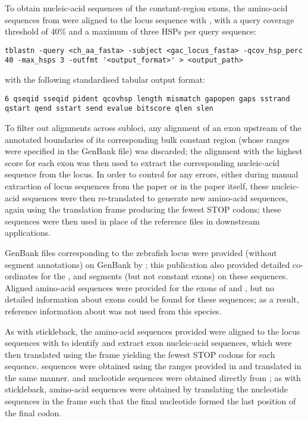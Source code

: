 To obtain nucleic-acid sequences of the constant-region exons, the amino-acid sequences from \parencite{bao2010stickleback} were aligned to the locus sequence with  \parencite{gertz2006tblastn}, with a query coverage threshold of 40\% and a maximum of three HSPs per query sequence:

\begin{lstlisting}
tblastn -query <ch_aa_fasta> -subject <gac_locus_fasta> -qcov_hsp_perc 40 -max_hsps 3 -outfmt '<output_format>' > <output_path>
\end{lstlisting}

\noindent with the following standardised tabular output format: 

\begin{lstlisting}
6 qseqid sseqid pident qcovhsp length mismatch gapopen gaps sstrand qstart qend sstart send evalue bitscore qlen slen
\end{lstlisting}

To filter out alignments across subloci, any alignment of an exon upstream of the annotated boundaries of its corresponding bulk constant region (whose ranges were specified in the GenBank file) was discarded; the alignment with the highest score for each exon was then used to extract the corresponding nucleic-acid sequence from the locus. In order to control for any errors, either during manual extraction of locus sequences from the paper or in the paper itself, these nucleic-acid sequences were then re-translated to generate new amino-acid sequences, again using the translation frame producing the fewest STOP codons; these sequences were then used in place of the reference files in downstream applications.


GenBank files corresponding to the zebrafish \igh{} locus were provided (without segment annotations) on GenBank by \parencite{danilova2005zebrafish}; this publication also provided detailed co-ordinates for the \vh, \dh and \jh segments (but not constant exons) on these sequences. Aligned amino-acid sequences were provided for the exons of  and , but no detailed information about  exons could be found for these sequences; as a result, reference information about  was not used from this species.

As with stickleback, the amino-acid sequences provided were aligned to the locus sequences  with  to identify and extract exon nucleic-acid sequences, which were then translated using the frame yielding the fewest STOP codons for each sequence. \vh sequences were obtained using the ranges provided in \parencite{danilova2005zebrafish} and translated in the same manner. \dh and \jh nucleotide sequences were obtained directly from \parencite{danilova2005zebrafish}; as with stickleback, \jh amino-acid sequences were obtained by translating the nucleotide sequences in the frame such that the final nucleotide formed the last position of the final codon.

